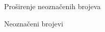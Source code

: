 
\begin{frame}[label=05-s030]{Proširenje neoznačenih brojeva}
\fontsize{10}{12}\selectfont

\par\vspace{4mm}
Neoznačeni brojevi\par\vspace{2mm}

\end{frame}
